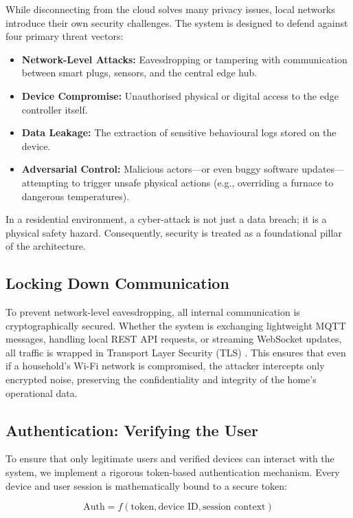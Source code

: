 \documentclass[11pt,a4paper]{article}
\begin{document}
While disconnecting from the cloud solves many privacy issues, local networks introduce their own security challenges. The system is designed to defend against four primary threat vectors:
\begin{itemize}
    \item \textbf{Network-Level Attacks:} Eavesdropping or tampering with communication between smart plugs, sensors, and the central edge hub.
    \item \textbf{Device Compromise:} Unauthorised physical or digital access to the edge controller itself.
    \item \textbf{Data Leakage:} The extraction of sensitive behavioural logs stored on the device.
    \item \textbf{Adversarial Control:} Malicious actors---or even buggy software updates---attempting to trigger unsafe physical actions (e.g., overriding a furnace to dangerous temperatures).
\end{itemize}
In a residential environment, a cyber-attack is not just a data breach; it is a physical safety hazard. Consequently, security is treated as a foundational pillar of the architecture.

\subsection{Locking Down Communication}

To prevent network-level eavesdropping, all internal communication is cryptographically secured. Whether the system is exchanging lightweight MQTT messages, handling local REST API requests, or streaming WebSocket updates, all traffic is wrapped in Transport Layer Security (TLS) \cite{kothmayr2013dtls}. This ensures that even if a household's Wi-Fi network is compromised, the attacker intercepts only encrypted noise, preserving the confidentiality and integrity of the home's operational data.

\subsection{Authentication: Verifying the User}

To ensure that only legitimate users and verified devices can interact with the system, we implement a rigorous token-based authentication mechanism. Every device and user session is mathematically bound to a secure token:

$$
\text{Auth} = f(\text{token}, \text{device ID}, \text{session context})
$$
\end{document}
